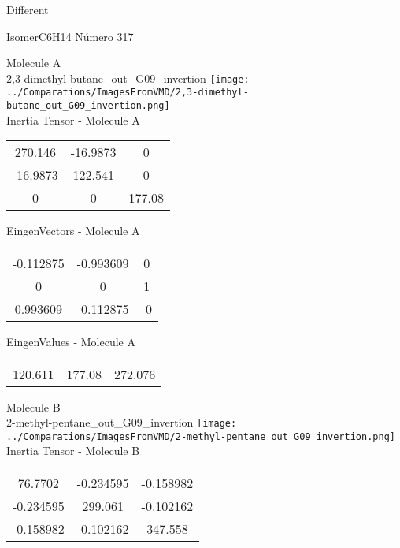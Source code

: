\begin{center}
\vtab
\vtab
\textcolor{NavyBlue}{\Large Different}
\end{center}

 \newpage

\vtab[-2cm]
\begin{center}
{\large IsomerC6H14 \tab Número 317}
\end{center}
\begin{multicols}{2}
\begin{center}

Molecule A \\ 
2,3-dimethyl-butane\_out\_G09\_invertion
\texttt{[image: ../Comparations/ImagesFromVMD/2,3-dimethyl-butane\_out\_G09\_invertion.png]}
\\
Inertia Tensor - Molecule A \\
\vtab

\begin{tabular}{|c c c|}
270.146	 & 	-16.9873	 & 	0	 \\
-16.9873	 & 	122.541	 & 	0	 \\
0	 & 	0	 & 	177.08
\end{tabular}

\vtab
 EingenVectors - Molecule A     \\
\vtab
\begin{tabular}{|c c c|}
-0.112875	 & 	-0.993609	 & 	0	 \\
0	 & 	0	 & 	1	 \\
0.993609	 & 	-0.112875	 & 	-0
\end{tabular}

\vtab
 EingenValues - Molecule A     \\
\vtab
\begin{tabular}{|c c c|}
120.611	 & 	177.08	 & 	272.076	 \\
\end{tabular}
\columnbreak

Molecule B \\ 
2-methyl-pentane\_out\_G09\_invertion
\texttt{[image: ../Comparations/ImagesFromVMD/2-methyl-pentane\_out\_G09\_invertion.png]}
\\
Inertia Tensor - Molecule B \\
\vtab

\begin{tabular}{|c c c|}
76.7702	 & 	-0.234595	 & 	-0.158982	 \\
-0.234595	 & 	299.061	 & 	-0.102162	 \\
-0.158982	 & 	-0.102162	 & 	347.558
\end{tabular}


\end{center}
\end{multicols}
